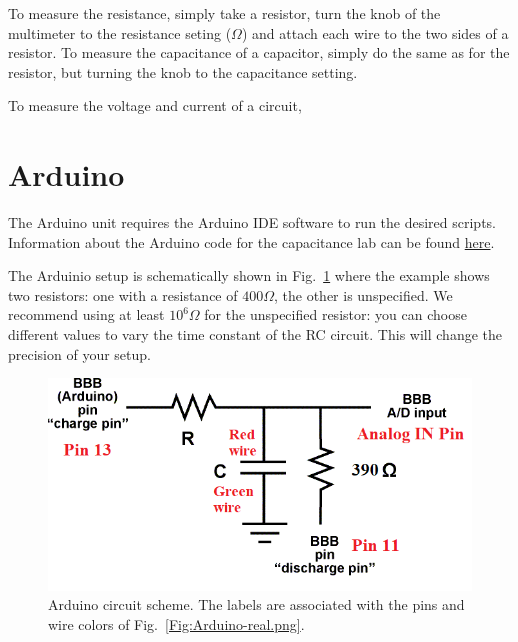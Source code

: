 \documentclass[12pt]{report}
\begin{document}
\begin{appendix}
To measure the resistance, simply take a resistor, turn the knob of the multimeter to the resistance seting ($\Omega$) and attach each wire to the two sides of a resistor. To measure the capacitance of a capacitor, simply do the same as for the resistor, but turning the knob to the capacitance setting.

To measure the voltage and current of a circuit,

\section{Arduino}
The Arduino unit requires the Arduino IDE software to run the desired scripts. Information about the Arduino code for the capacitance lab can be found \href{https://www.arduino.cc/en/Tutorial/CapacitanceMeter}{here}.

The Arduinio setup is schematically shown in Fig.~\ref{Fig:ArduinoSchem} where the example shows two resistors: one with a resistance of $400 \Omega$, the other is unspecified. We recommend using at least $10^6 \Omega$ for the unspecified resistor: you can choose different values to vary the time constant of the RC circuit. This will change the precision of your setup.

\begin{figure}[H]
\centering
\includegraphics[scale=0.85]{CapacitanceMeterSchem.png}
\caption{Arduino circuit scheme. The labels are associated with the pins and wire colors of Fig.~\ref{Fig:Arduino-real.png}.}
\label{Fig:ArduinoSchem}
\end{figure}


\end{appendix}
\end{document}
